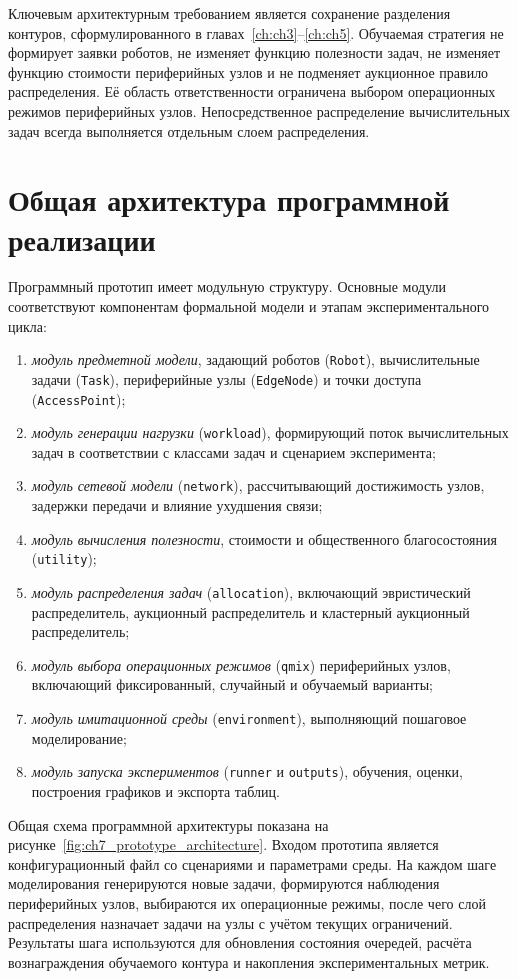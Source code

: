 Ключевым архитектурным требованием является сохранение разделения контуров, сформулированного в главах~\ref{ch:ch3}--\ref{ch:ch5}. Обучаемая стратегия не формирует заявки роботов, не изменяет функцию полезности задач, не изменяет функцию стоимости периферийных узлов и не подменяет аукционное правило распределения. Её область ответственности ограничена выбором операционных режимов периферийных узлов. Непосредственное распределение вычислительных задач всегда выполняется отдельным слоем распределения.

\section{Общая архитектура программной реализации}

Программный прототип имеет модульную структуру. Основные модули соответствуют компонентам формальной модели и этапам экспериментального цикла:
\begin{enumerate}
    \item \textit{модуль предметной модели}, задающий роботов (\texttt{Robot}), вычислительные задачи (\texttt{Task}), периферийные узлы (\texttt{EdgeNode}) и точки доступа (\texttt{AccessPoint});
	\item \textit{модуль генерации нагрузки} (\texttt{workload}), формирующий поток вычислительных задач в соответствии с классами задач и сценарием эксперимента;
	\item \textit{модуль сетевой модели} (\texttt{network}), рассчитывающий достижимость узлов, задержки передачи и влияние ухудшения связи;
	\item \textit{модуль вычисления полезности}, стоимости и общественного благосостояния (\texttt{utility});
	\item \textit{модуль распределения задач} (\texttt{allocation}), включающий эвристический распределитель, аукционный распределитель и кластерный аукционный распределитель;
	\item \textit{модуль выбора операционных режимов} (\texttt{qmix}) периферийных узлов, включающий фиксированный, случайный и обучаемый варианты;
	\item \textit{модуль имитационной среды} (\texttt{environment}), выполняющий пошаговое моделирование;
	\item \textit{модуль запуска экспериментов} (\texttt{runner} и \texttt{outputs}), обучения, оценки, построения графиков и экспорта таблиц.
\end{enumerate}

Общая схема программной архитектуры показана на рисунке~\ref{fig:ch7_prototype_architecture}. Входом прототипа является конфигурационный файл со сценариями и параметрами среды. На каждом шаге моделирования генерируются новые задачи, формируются наблюдения периферийных узлов, выбираются их операционные режимы, после чего слой распределения назначает задачи на узлы с учётом текущих ограничений. Результаты шага используются для обновления состояния очередей, расчёта вознаграждения обучаемого контура и накопления экспериментальных метрик.

